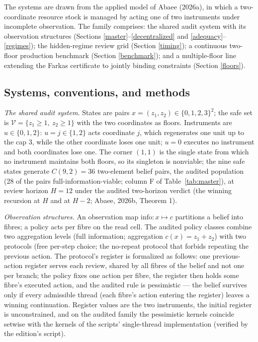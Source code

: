 \documentclass[10pt,twocolumn]{article}
\theoremstyle{definition}
\begin{document}
The systems are drawn from the applied model of Abaee (2026a), in which
a two-coordinate resource stock is managed by acting one of two
instruments under incomplete observation. The family comprises: the
shared audit system with its observation structures (Sections
\ref{master}--\ref{decentralized} and \ref{adequacy}--\ref{regimes});
the hidden-regime review grid (Section
\ref{timing}); a continuous two-floor production benchmark (Section
\ref{benchmark}); and a multiple-floor line extending the Farkas
certificate to jointly binding constraints (Section \ref{floors}).

\subsection{Systems, conventions, and methods}\label{frame}

\emph{The shared audit system.} States are pairs
\(x = (z_1, z_2) \in \{0,1,2,3\}^{2}\); the safe set is
\(\mathcal{V} = \{z_1 \ge 1,\ z_2 \ge 1\}\) with the two coordinates as
floors. Instruments are \(u \in \{0, 1, 2\}\): \(u = j \in \{1,2\}\)
acts coordinate \(j\), which regenerates one unit up to the cap \(3\),
while the other coordinate loses one unit; \(u = 0\) executes no
instrument and both coordinates lose one. The corner \((1,1)\) is the
single state from which no instrument maintains both floors, so its
singleton is nonviable; the nine safe states generate
\(C(9,2) = 36\) two-element belief pairs, the audited population (28 of the pairs full-information-viable; column F of Table~\ref{tab:master}), at
review horizon \(H = 12\) under the audited two-horizon verdict (the
winning recursion at \(H\) and at \(H - 2\); Abaee, 2026b, Theorem 1).

\emph{Observation structures.} An observation map
\(\mathrm{info}: x \mapsto c\) partitions a belief into fibres; a policy
acts per fibre on the read cell. The audited policy classes combine two
aggregation levels (full information; aggregation
\(c(x) = z_1 + z_2\)) with two protocols (free per-step choice; the
no-repeat protocol that forbids repeating the previous action. The
protocol's register is formalized as follows: one previous-action register
serves each review, shared by all fibres of the belief and not one per
branch; the policy fixes one action per fibre, the register then holds
some fibre's executed action, and the audited rule is pessimistic --- the
belief survives only if every admissible thread (each fibre's action
entering the register) leaves a winning continuation. Register values are
the two instruments, the initial register is unconstrained, and on the
audited family the pessimistic kernels coincide setwise with the kernels
of the scripts' single-thread implementation (verified by the edition's
script).
\end{document}
